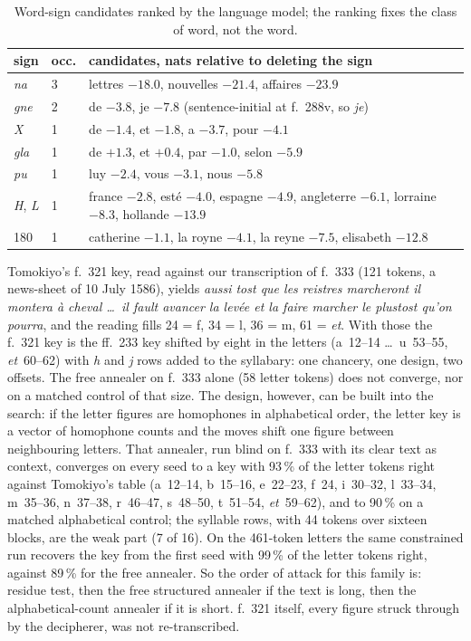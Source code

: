 \documentclass[11pt]{article}
\begin{document}
\begin{table}[t]
\centering\small
\begin{tabular}{@{}lll@{}}
\toprule
sign & occ. & candidates, nats relative to deleting the sign \\
\midrule
\emph{na} & 3 & lettres $-18.0$, nouvelles $-21.4$, affaires $-23.9$ \\
\emph{gne} & 2 & de $-3.8$, je $-7.8$ (sentence-initial at f.~288v, so \emph{je}) \\
\emph{X} & 1 & de $-1.4$, et $-1.8$, a $-3.7$, pour $-4.1$ \\
\emph{gla} & 1 & de $+1.3$, et $+0.4$, par $-1.0$, selon $-5.9$ \\
\emph{pu} & 1 & luy $-2.4$, vous $-3.1$, nous $-5.8$ \\
\emph{H}, \emph{L} & 1 & france $-2.8$, esté $-4.0$, espagne $-4.9$, angleterre $-6.1$, lorraine $-8.3$, hollande $-13.9$ \\
180 & 1 & catherine $-1.1$, la royne $-4.1$, la reyne $-7.5$, elisabeth $-12.8$ \\
\bottomrule
\end{tabular}
\caption{\label{tab:signs} Word-sign candidates ranked by the language model; the ranking fixes the class of word, not the word.}
\end{table}

Tomokiyo's f.~321 key, read against our transcription of f.~333 (121 tokens, a news-sheet of 10 July 1586), yields \emph{aussi tost que les reistres marcheront il montera \`a cheval \ldots\ il fault avancer la lev\'ee et la faire marcher le plustost qu'on pourra}, and the reading fills 24 = f, 34 = l, 36 = m, 61 = \emph{et}. With those the f.~321 key is the ff.~233 key shifted by eight in the letters (a~12--14 \ldots\ u~53--55, \emph{et}~60--62) with \emph{h} and \emph{j} rows added to the syllabary: one chancery, one design, two offsets. The free annealer on f.~333 alone (58 letter tokens) does not converge, nor on a matched control of that size. The design, however, can be built into the search: if the letter figures are homophones in alphabetical order, the letter key is a vector of homophone counts and the moves shift one figure between neighbouring letters. That annealer, run blind on f.~333 with its clear text as context, converges on every seed to a key with 93\,\% of the letter tokens right against Tomokiyo's table (a~12--14, b~15--16, e~22--23, f~24, i~30--32, l~33--34, m~35--36, n~37--38, r~46--47, s~48--50, t~51--54, \emph{et}~59--62), and to 90\,\% on a matched alphabetical control; the syllable rows, with 44 tokens over sixteen blocks, are the weak part (7 of 16). On the 461-token letters the same constrained run recovers the key from the first seed with 99\,\% of the letter tokens right, against 89\,\% for the free annealer. So the order of attack for this family is: residue test, then the free structured annealer if the text is long, then the alphabetical-count annealer if it is short. f.~321 itself, every figure struck through by the decipherer, was not re-transcribed.
\end{document}
